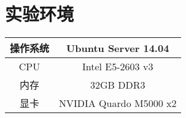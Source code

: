\chapter{实验环境}

\begin{tabular}{|c|c|}
\caption{实验用工作站硬件配置}\label{Tab:WorkstationInfo}
\centering
\hline
操作系统 & Ubuntu Server 14.04 \\
\hline
CPU & Intel E5-2603 v3 \\
\hline
内存 & 32GB DDR3 \\
\hline
显卡 & NVIDIA Quardo M5000 x2 \\
\hline
\end{tabular}